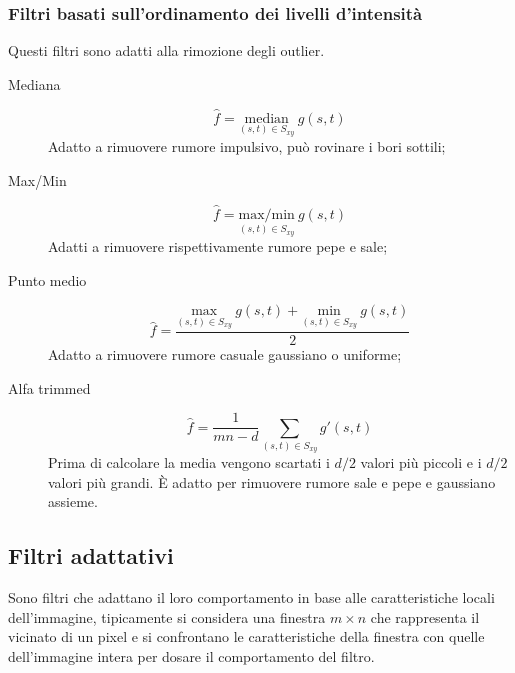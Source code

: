 \subsubsection{Filtri basati sull'ordinamento dei livelli d'intensità}
Questi filtri sono adatti alla rimozione degli outlier.
\begin{description}
	\item[Mediana]
		\begin{equation}
			\hat{f} = \underset{(s,t)\in S_{xy}}{\text{median}}\ g(s,t)
		\end{equation}
		Adatto a rimuovere rumore impulsivo, può rovinare i bori sottili;
		\item[Max/Min]
		\begin{equation}
			\hat{f} = \underset{(s,t)\in S_{xy}}{\text{max/min}}\ g(s,t)
		\end{equation}
		Adatti a rimuovere rispettivamente rumore pepe e sale;
		\item[Punto medio]
		\begin{equation}
			\hat{f} = \frac{\underset{(s,t)\in S_{xy}}{\text{max}}\ g(s,t) + \underset{(s,t)\in S_{xy}}{\text{min}}\ g(s,t)}{2}
		\end{equation}
		Adatto a rimuovere rumore casuale gaussiano o uniforme;
		\item[Alfa trimmed]
		\begin{equation}
			\hat{f} = \frac{1}{mn - d} \sum_{(s,t)\in S_{xy}} g'(s,t)
		\end{equation}
		Prima di calcolare la media vengono scartati i $d/2$ valori più piccoli e i $d/2$ valori più grandi. È adatto per rimuovere rumore sale e pepe e gaussiano assieme.
\end{description}

\subsection{Filtri adattativi}
Sono filtri che adattano il loro comportamento in base alle caratteristiche locali dell'immagine, tipicamente si considera una finestra $m\times n$ che rappresenta il vicinato di un pixel e si confrontano le caratteristiche della finestra con quelle dell'immagine intera per dosare il comportamento del filtro.
